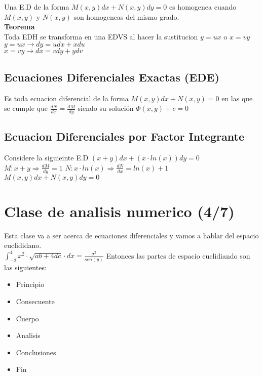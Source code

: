 \documentclass[12pt]{article}
\begin{document}
Una E.D de la forma $M(x,y)dx+N(x,y)dy=0$ es homogenea cuando $M(x,y)$ y $N(x,y)$ son homogeneas del mismo grado.
\\ \textbf{Teorema}
\\Toda EDH se transforma en una EDVS al hacer la sustitucion $y=ux$ o $x=vy$
\\$y=ux \rightarrow dy=udx+xdu$
\\$x=vy \rightarrow dx=vdy+ydv$

\subsection{Ecuaciones Diferenciales Exactas (EDE)}
Es toda ecuacion diferencial de la forma $M(x,y)dx+N(x,y)=0$ en las que se cumple que $\frac{dN}{dx}=\frac{dM}{dy}$ siendo su solución $\Phi(x,y)+c=0$

\subsection{Ecuacion Diferenciales por Factor Integrante}
Considere la siguieinte E.D $(x+y)dx+(x\cdot ln(x))dy=0$
$M:x+y \Rightarrow \frac{dM}{dy}=1$
$N:x\cdot ln(x) \Rightarrow \frac{dN}{dx}=ln(x)+1$
$M(x,y)dx+N(x,y)dy=0$

\section{Clase de analisis numerico (4/7)}
Esta clase va a ser acerca de ecuaciones diferenciales y vamos a hablar del espacio euclididano.
\\ $\displaystyle \int _{-2}^{4}{x^2 \cdot \sqrt{ab+4dc} \cdot dx} = \frac{\sigma ^2 }{sen(y)}$
\newpage
Entonces las partes de espacio euclidiando son las siguientes:
\begin{itemize}
  \item Principio 
  \item Consecuente 
  \item Cuerpo 
  \item Analisis
  \item Conclusiones
  \item Fin
\end{itemize}
\end{document}

